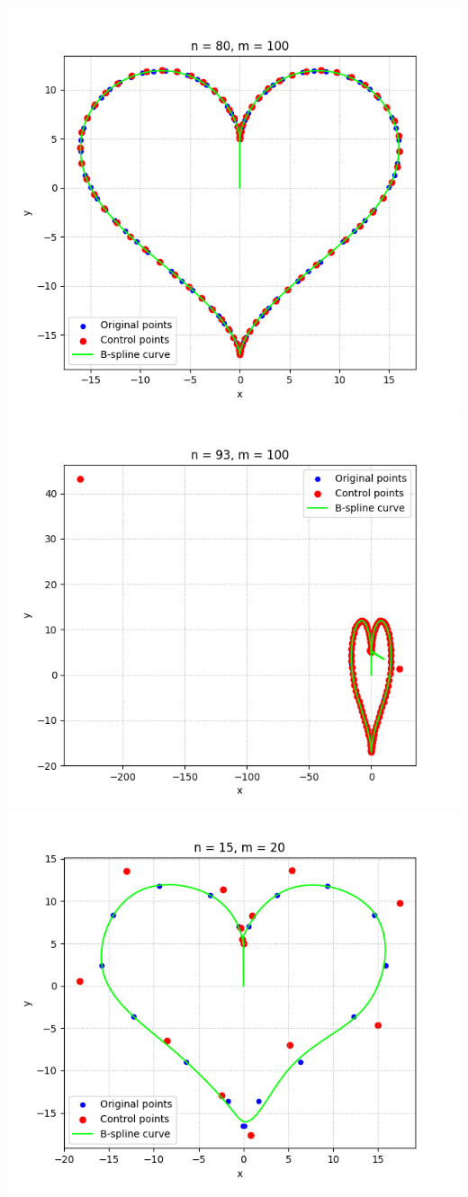 \documentclass[11pt]{article}
\begin{document}
\includegraphics[scale=0.3]{images/coeur3.png}
\includegraphics[scale=0.3]{images/coeur4.png}
\includegraphics[scale=0.31]{images/coeur5.png}
\end{document}
